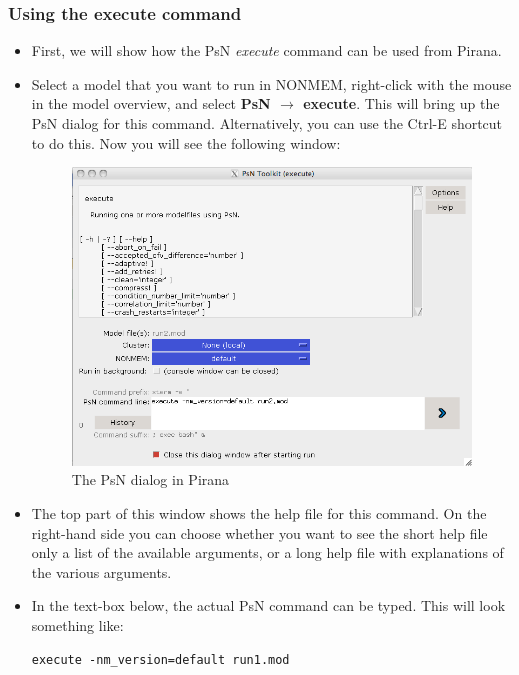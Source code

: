 \subsubsection*{Using the execute command}

\begin{itemize}
\item First, we will show how the PsN \textit{execute} command can be used
from Pirana. 

\item Select a model that you want to run in NONMEM, right-click with
  the mouse in the model overview, and select \textbf{PsN
    $\rightarrow$ execute}. This will bring up the PsN dialog for this
  command. Alternatively, you can use the Ctrl-E shortcut to do
  this. Now you will see the following window:

\begin{figure}[h] \centering
  \includegraphics[scale=.4]{images/psn_dialog.png}
  \caption{The PsN dialog in Pirana\label{fig:Fig2}}
\end{figure}

\item The top part of this window shows the help file for this command. On
the right-hand side you can choose whether you want to see the short
help file only a list of the available arguments, or a long help file
with explanations of the various arguments. 

\item In the text-box below, the actual PsN command can be typed. This will
look something like:

\begin{verbatim}
execute -nm_version=default run1.mod
\end{verbatim}


\end{itemize}
